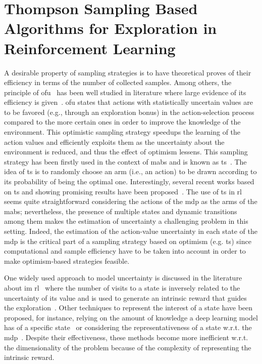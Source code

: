 \chapter{Thompson Sampling Based Algorithms for Exploration in Reinforcement Learning}\label{C:ts}
A desirable property of sampling strategies is to have theoretical proves of their efficiency in terms of the number of collected samples. Among others, the principle of \gls{ofu}~\cite{lai1985asymptotically} has been well studied in literature where large evidence of its efficiency is given~\cite{jaksch2010near, kakade2003sample, kearns2002near}. \gls{ofu} states that actions with statistically uncertain values are to be favored (e.g., through an exploration bonus) in the action-selection process compared to the more certain ones in order to improve the knowledge of the environment. This optimistic sampling strategy speedups the learning of the action values and efficiently exploits them as the uncertainty about the environment is reduced, and thus the effect of optimism lessens. This sampling strategy has been firstly used in the context of \glspl{mab} and is known as \gls{ts}~\cite{thompson1933likelihood}. The idea of \gls{ts} is to randomly choose an arm (i.e., an action) to be drawn according to its probability of being the optimal one. Interestingly, several recent works based on \gls{ts} and showing promising results have been proposed~\cite{chapelle2011empirical, granmo2010solving, may2011simulation, scott2010modern}. The use of \gls{ts} in \gls{rl} seems quite straightforward considering the actions of the \gls{mdp} as the arms of the \glspl{mab}; nevertheless, the presence of multiple states and dynamic transitions among them makes the estimation of uncertainty a challenging problem in this setting. Indeed, the estimation of the action-value uncertainty in each state of the \gls{mdp} is the critical part of a sampling strategy based on optimism (e.g. \gls{ts}) since computational and sample efficiency have to be taken into account in order to make optimism-based strategies feasible.

One widely used approach to model uncertainty is discussed in the literature about \gls{im} \gls{rl}~\cite{chentanez2005intrinsically, schmidhuber1991possibility} where the number of visits to a state is inversely related to the uncertainty of its value and is used to generate an intrinsic reward that guides the exploration~\cite{bellemare2016unifying, tang2017exploration}. Other techniques to represent the interest of a state have been proposed, for instance, relying on the amount of knowledge a deep learning model has of a specific state~\cite{pathak2017curiosity} or considering the representativeness of a state w.r.t. the \gls{mdp}~\cite{bonarini2006self}. Despite their effectiveness, these methods become more inefficient w.r.t. the dimensionality of the problem because of the complexity of representing the intrinsic reward.


